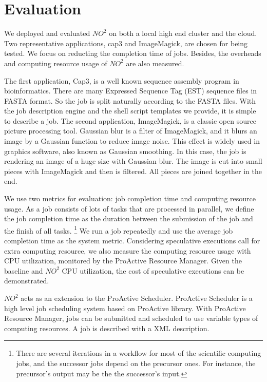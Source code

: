 \section{Evaluation}
We deployed and evaluated $NO^2$ on both a local high end cluster and the cloud. Two
representative applications, cap3 and ImageMagick, are chosen for being tested. We focus on
reducting the completion time of jobs. Besides, the overheads and computing resource usage of $NO^2$ are also measured.

The first application, Cap3, is a well known sequence assembly program in bioinformatics. 
There are many Expressed Sequence Tag (EST) sequence files in
FASTA format. So the job is split naturally according to the FASTA files. With the job
description engine and the shell script templates we provide, it is
simple to describe a job. The second application, ImageMagick, is a classic open
source picture processing tool. Gaussian blur is a filter of ImageMagick, and it blurs an
image by a Gaussian function to reduce image noise. This effect is widely used in graphics
software, also known as Gaussian smoothing. In this case, the job is rendering an image of
a huge size with Gaussian blur. The image is cut into small pieces with ImageMagick and
then is filtered. All pieces are joined together in the end.

We use two metrics for evaluation: job completion time and computing resource usage. As a
job consists of lots of tasks that are processed in parallel, we define the job completion time
as the duration between the submission of the job and the finish of all tasks.
\footnote{ There are several iterations in a workflow for most of the scientific computing jobs, 
 and the successor jobs depend on the precursor ones. For instance, the
precursor's output may be the the successor's input.} We run a job repeatedly
and use the average job completion time as the system metric. Considering
speculative executions call for extra computing resource, we also measure the computing
resource usage with CPU utilization, monitored by the ProActive Resource Manager. Given
the baseline and $NO^2$ CPU utilization, the cost of speculative executions can be
demonstrated.

$NO^2$ acts as an extension to the ProActive Scheduler. ProActive Scheduler is a high
level job scheduling system based on ProActive library. With ProActive Resource Manager,
jobs can be submitted and scheduled to use variable types of computing resources. A job is
described with a XML description.

